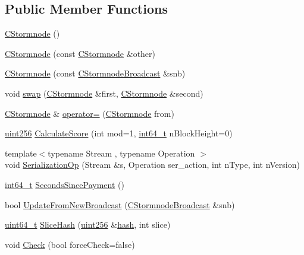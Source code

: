 \subsection*{Public Member Functions}
\begin{DoxyCompactItemize}
\item 
\hyperlink{class_c_stormnode_a7601ef94f912fc9d00406c2349accd9e}{C\+Stormnode} ()
\item 
\hyperlink{class_c_stormnode_ac5d7c79ce5e3187bf1703bdf968e4c2e}{C\+Stormnode} (const \hyperlink{class_c_stormnode}{C\+Stormnode} \&other)
\item 
\hyperlink{class_c_stormnode_a81bcdb5b9c2b0219667edc3bfd62c1af}{C\+Stormnode} (const \hyperlink{class_c_stormnode_broadcast}{C\+Stormnode\+Broadcast} \&snb)
\item 
void \hyperlink{class_c_stormnode_aefe9e633b4f4f7ce4af12a64faf100d4}{swap} (\hyperlink{class_c_stormnode}{C\+Stormnode} \&first, \hyperlink{class_c_stormnode}{C\+Stormnode} \&second)
\item 
\hyperlink{class_c_stormnode}{C\+Stormnode} \& \hyperlink{class_c_stormnode_af951dafbb25b9e659ef86cd52683aa7f}{operator=} (\hyperlink{class_c_stormnode}{C\+Stormnode} from)
\item 
\hyperlink{classuint256}{uint256} \hyperlink{class_c_stormnode_a6e1fab43d9494177da3f8599c4645516}{Calculate\+Score} (int mod=1, \hyperlink{stdint_8h_adec1df1b8b51cb32b77e5b86fff46471}{int64\+\_\+t} n\+Block\+Height=0)
\item 
{\footnotesize template$<$typename Stream , typename Operation $>$ }\\void \hyperlink{class_c_stormnode_a7942368f526da3cfd40e77b8dd7cffd1}{Serialization\+Op} (Stream \&s, Operation ser\+\_\+action, int n\+Type, int n\+Version)
\item 
\hyperlink{stdint_8h_adec1df1b8b51cb32b77e5b86fff46471}{int64\+\_\+t} \hyperlink{class_c_stormnode_abce24148c6618317ab287e8e284c12d6}{Seconds\+Since\+Payment} ()
\item 
bool \hyperlink{class_c_stormnode_a17bb6549af310bf95190260959a54c73}{Update\+From\+New\+Broadcast} (\hyperlink{class_c_stormnode_broadcast}{C\+Stormnode\+Broadcast} \&snb)
\item 
\hyperlink{stdint_8h_aaa5d1cd013383c889537491c3cfd9aad}{uint64\+\_\+t} \hyperlink{class_c_stormnode_a2231073a0817c566e0d5c3fa08f53b5c}{Slice\+Hash} (\hyperlink{classuint256}{uint256} \&\hyperlink{cache_8cc_a11ecb029164e055f28f4123ce3748862}{hash}, int slice)
\item 
void \hyperlink{class_c_stormnode_af2e9fab8911feaeb300b56702d933a67}{Check} (bool force\+Check=false)

\end{DoxyCompactItemize}

